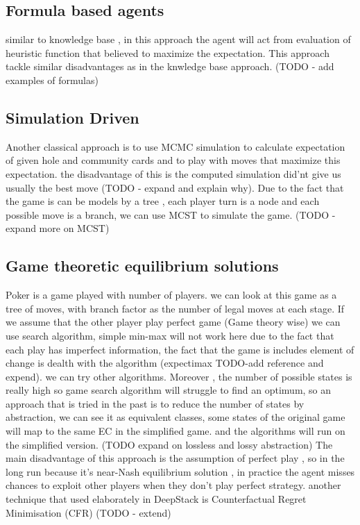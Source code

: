 \documentclass{article}
\begin{document}
\subsection{Formula based agents}
similar to knowledge base , in this approach the agent will act from evaluation of heuristic function that believed to maximize the expectation.
This approach tackle similar disadvantages as in the knwledge base approach.
(TODO - add examples of formulas)
\subsection{Simulation Driven}
Another classical approach is to use MCMC simulation to calculate expectation of given hole and community cards and to play with moves that maximize this expectation.
the disadvantage of this is the computed simulation did'nt give us usually the best move (TODO - expand and explain why).
Due to the fact that the game is can be models by a tree , each player turn is a node and each possible move is a branch, we can use MCST to simulate the game.
(TODO - expand more on MCST)
\subsection{Game theoretic equilibrium solutions}
Poker is a game played with number of players. we can look at this game as a tree of moves, with branch factor as the number of legal moves at each stage.
If we assume that the other player play perfect game (Game theory wise) we can use search algorithm, simple min-max will not work here due to the fact
that each play has imperfect information, the fact that the game is includes element of change is dealth with the algorithm (expectimax TODO-add reference and expend). we can try other algorithms.
Moreover , the number of possible states is really high so game search algorithm will struggle to find an optimum, so an approach that is tried in the past is to reduce
the number of states by abstraction, we can see it as equivalent classes, some states of the original game will map to the same EC in the simplified game.
and the algorithms will run on the simplified version. (TODO expand on lossless and lossy abstraction)
The main disadvantage of this approach is the assumption of perfect play , so in the long run because it's near-Nash equilibrium solution ,
 in practice the agent misses chances to exploit other players when they don't play perfect strategy.
another technique that used elaborately in DeepStack \cite{deepstack} is Counterfactual Regret Minimisation (CFR) (TODO - extend)
\end{document}
